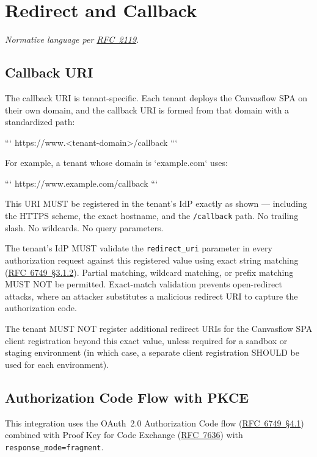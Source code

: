
\section{Redirect and Callback}

\textit{Normative language per \href{https://tools.ietf.org/html/rfc2119}{RFC~2119}.}

\subsection{Callback URI}

The callback URI is tenant-specific. Each tenant deploys the Canvasflow SPA on 
their own domain, and the callback URI is formed from that domain with a 
standardized path:

```
https://www.<tenant-domain>/callback
```

For example, a tenant whose domain is `example.com` uses:

```
https://www.example.com/callback
```

This URI MUST be registered in the tenant's IdP exactly as shown --- including the HTTPS
scheme, the exact hostname, and the \texttt{/callback} path. No trailing slash. No
wildcards. No query parameters.



The tenant's IdP MUST validate the \texttt{redirect\_uri} parameter in every
authorization request against this registered value using exact string matching
(\href{https://tools.ietf.org/html/rfc6749#section-3.1.2}{RFC~6749~\S3.1.2}). 
Partial matching, wildcard matching, or prefix matching MUST NOT be permitted. 
Exact-match validation prevents open-redirect attacks, where an attacker substitutes 
a malicious redirect URI to capture the authorization code.

The tenant MUST NOT register additional redirect URIs for the Canvasflow SPA client
registration beyond this exact value, unless required for a sandbox or staging
environment (in which case, a separate client registration SHOULD be used for each
environment).

\subsection{Authorization Code Flow with PKCE}\label{sec:authorization-with-pkce}

This integration uses the OAuth~2.0 Authorization Code flow 
(\href{https://tools.ietf.org/html/rfc6749#section-4.1}{RFC~6749~\S4.1}) combined
with Proof Key for Code Exchange 
(\href{https://tools.ietf.org/html/rfc7636}{RFC~7636}) with 
\texttt{response\_mode=fragment}.

